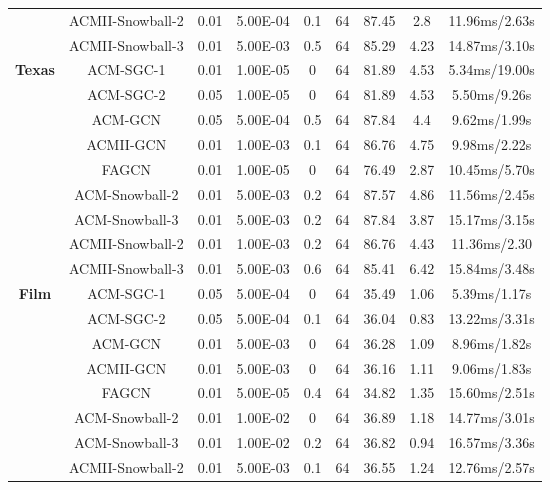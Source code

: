 \documentclass{article}
\newcommand{\0}{{\boldsymbol{0}}}
\newcommand{\6}{{\partial}}
\newcommand{\8}{{\infty}}
\newcommand{\4}{{\nabla}}
\begin{document}
\begin{table}[htbp]
{\begin{tabular}{c|c|ccccccc}
          & ACMII-Snowball-2 & 0.01  & 5.00E-04 & 0.1   & 64    & 87.45 & 2.8   & 11.96ms/2.63s \\
          & ACMII-Snowball-3 & 0.01  & 5.00E-03 & 0.5   & 64    & 85.29 & 4.23  & 14.87ms/3.10s \\
           \midrule
    \multirow{9}[0]{*}{\textbf{Texas}} & ACM-SGC-1 & 0.01  & 1.00E-05 & 0     & 64    & 81.89 & 4.53  & 5.34ms/19.00s \\
          & ACM-SGC-2 & 0.05  & 1.00E-05 & 0     & 64    & 81.89 & 4.53  & 5.50ms/9.26s \\
          & ACM-GCN & 0.05  & 5.00E-04 & 0.5   & 64    & 87.84 & 4.4   & 9.62ms/1.99s \\
          & ACMII-GCN & 0.01  & 1.00E-03 & 0.1   & 64    & 86.76 & 4.75  & 9.98ms/2.22s \\
          & FAGCN & 0.01  & 1.00E-05 & 0     & 64    & 76.49 & \textcolor[rgb]{ .267,  .267,  .267}{2.87} & 10.45ms/5.70s \\
          & ACM-Snowball-2 & 0.01  & 5.00E-03 & 0.2   & 64    & 87.57 & 4.86  & 11.56ms/2.45s \\
          & ACM-Snowball-3 & 0.01  & 5.00E-03 & 0.2   & 64    & 87.84 & 3.87  & 15.17ms/3.15s \\
          & ACMII-Snowball-2 & 0.01  & 1.00E-03 & 0.2   & 64    & 86.76 & 4.43  & 11.36ms/2.30 \\
          & ACMII-Snowball-3 & 0.01  & 5.00E-03 & 0.6   & 64    & 85.41 & 6.42  & 15.84ms/3.48s \\
           \midrule
    \multirow{9}[0]{*}{\textbf{Film}} & ACM-SGC-1 & 0.05  & 5.00E-04 & 0     & 64    & 35.49 & 1.06  & 5.39ms/1.17s \\
          & ACM-SGC-2 & 0.05  & 5.00E-04 & 0.1   & 64    & 36.04 & 0.83  & 13.22ms/3.31s \\
          & ACM-GCN & 0.01  & 5.00E-03 & 0     & 64    & 36.28 & 1.09  & 8.96ms/1.82s \\
          & ACMII-GCN & 0.01  & 5.00E-03 & 0     & 64    & 36.16 & 1.11  & 9.06ms/1.83s \\
          & FAGCN & 0.01  & 5.00E-05 & 0.4   & 64    & 34.82 & 1.35  & 15.60ms/2.51s \\
          & ACM-Snowball-2 & 0.01  & 1.00E-02 & 0     & 64    & 36.89 & 1.18  & 14.77ms/3.01s \\
          & ACM-Snowball-3 & 0.01  & 1.00E-02 & 0.2   & 64    & 36.82 & 0.94  & 16.57ms/3.36s \\
          & ACMII-Snowball-2 & 0.01  & 5.00E-03 & 0.1   & 64    & 36.55 & 1.24  & 12.76ms/2.57s \\

\end{tabular}}
\end{table}
\end{document}
